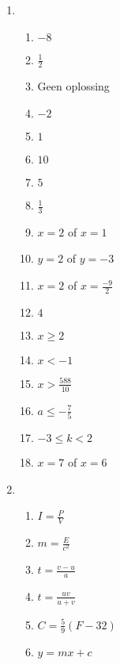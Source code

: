 {\begin{multicols}{3}
 
\begin{enumerate}[noitemsep, label=\textbf{\arabic*}. ] 
 \item %
\begin{enumerate}[noitemsep,label=\textbf{(\alph*)}]
\item $-8$%
\item $\frac{1}{2}$%
\item Geen oplossing%
\item $-2$%
\item $1$%
\item $10$%
\item $5$%
\item $\frac{1}{3}$%
\item $x = 2$ of $ x = 1$%
\item $y = 2$ of $y = -3$%
\item $x =2$ of $x = \frac{-9}{2}$%
\item $4$%
\item $x\geq 2$%
\item $x<-1$%
\item $x>\frac{588}{10}$%
\item $a\leq -\frac{7}{5}$%
\item $-3\leq k<2$%
\item $x = 7$ of $x = 6$%

\end{enumerate}

\item %
\begin{enumerate}[itemsep=1pt,label=\textbf{(\alph*)}]
\item $I=\frac{P}{V}$
\item $m=\frac{E}{c^2}$
\item $t=\frac{v-u}{a}$
\item $t=\frac{uv}{u+v}$
\item $C=\frac{5}{9}(F-32)$
\item $y=mx+c$
\end{enumerate}


\end{enumerate}
\end{multicols}}
